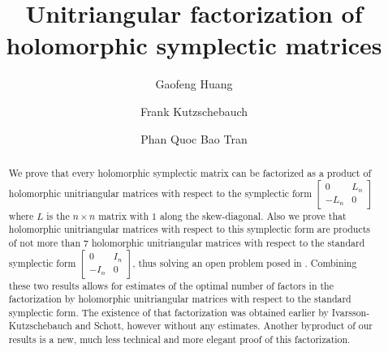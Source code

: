 \documentclass[10pt]{amsart}
\title{Unitriangular factorization of holomorphic symplectic matrices}
\author[G. Huang]{Gaofeng Huang}
\author[F. Kutzschebauch]{Frank Kutzschebauch}
\author[B. Tran]{Phan Quoc Bao Tran}
\theoremstyle{remark}
\begin{document}
\maketitle

\begin{abstract}
We prove that every holomorphic 
symplectic matrix can be factorized as a product of holomorphic unitriangular matrices with respect to the symplectic form $ \left[\begin{array}{ccc} 0 & L_n \\ -L_n & 0\end{array}\right]$ 
where $L$ is the $n \times n$ matrix with $1$ along the skew-diagonal.
Also we prove that holomorphic unitriangular matrices with respect to this symplectic form  are products of not more than $7$ holomorphic unitriangular matrices with respect to the standard symplectic form $\left[\begin{array}{ccc} 0 & I_n \\ -I_n & 0\end{array}\right]$, thus solving an open problem posed in \cite{HKS}.
Combining these two results allows for estimates of the optimal number of factors in the factorization by  holomorphic unitriangular matrices with respect to the standard symplectic form. The existence of that factorization was  obtained earlier by Ivarsson-Kutzschebauch and Schott, however without any estimates. 
Another byproduct of our results is a new, much less technical and more elegant proof of this factorization.
\end{abstract}

\tableofcontents
\end{document}
